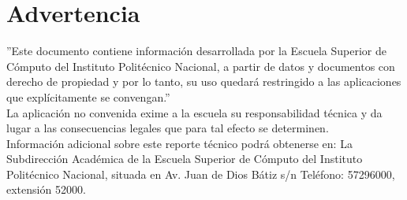 \chapter{Advertencia}


''Este documento contiene información desarrollada por la Escuela Superior de Cómputo del Instituto Politécnico Nacional, a partir de datos y documentos con derecho de propiedad y por lo tanto, su uso quedará restringido a las aplicaciones que explícitamente se convengan.''\\

La aplicación no convenida exime a la escuela su responsabilidad técnica y da lugar a las consecuencias legales que para tal efecto se determinen.\\

Información adicional sobre este reporte técnico podrá obtenerse en:
La Subdirección Académica de la Escuela Superior de Cómputo del Instituto Politécnico Nacional, situada en Av. Juan de Dios Bátiz s/n Teléfono: 57296000, extensión 52000.




